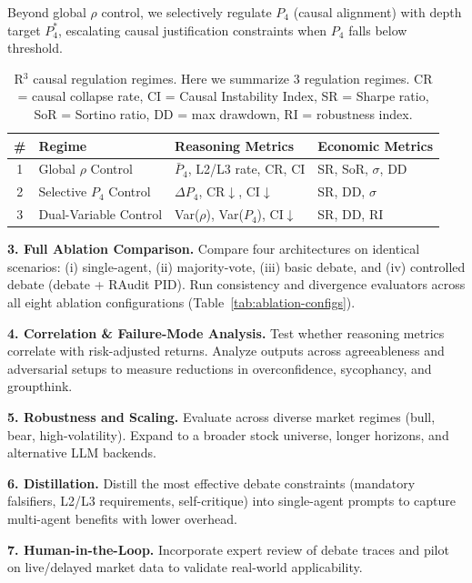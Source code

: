 \documentclass{article}
\begin{document}
Beyond global $\rho$ control, we selectively regulate $P_4$ (causal alignment) with depth target $P_4^*$, escalating causal justification constraints when $P_4$ falls below threshold. 

\begin{table}[H]
\centering
\small
\begin{tabular}{@{}clll@{}}
\toprule
\textbf{\#} & \textbf{Regime} & \textbf{Reasoning Metrics} & \textbf{Economic Metrics} \\
\midrule
1 & Global $\rho$ Control
& $\bar{P}_4$, L2/L3 rate, CR, CI
& SR, SoR, $\sigma$, DD \\
2 & Selective $P_4$ Control
& $\Delta P_4$, CR$\downarrow$, CI$\downarrow$
& SR, DD, $\sigma$ \\
3 & Dual-Variable Control
& Var($\rho$), Var($P_4$), CI$\downarrow$
& SR, DD, RI \\
\bottomrule
\end{tabular}
\vspace{4pt}
\setlength{\belowcaptionskip}{-4pt}
\caption{R$^3$ causal regulation regimes. Here we summarize 3 regulation regimes. CR = causal collapse rate, CI = Causal Instability Index, SR = Sharpe ratio, SoR = Sortino ratio, DD = max drawdown, RI = robustness index.}
\label{tab:r3-regimes}
\end{table}

\textbf{3. Full Ablation Comparison.}
Compare four architectures on identical scenarios: (i) single-agent, (ii) majority-vote, (iii) basic debate, and (iv) controlled debate (debate + RAudit PID). Run consistency and divergence evaluators across all eight ablation configurations (Table~\ref{tab:ablation-configs}).

\textbf{4. Correlation \& Failure-Mode Analysis.}
Test whether reasoning metrics correlate with risk-adjusted returns. Analyze outputs across agreeableness and adversarial setups to measure reductions in overconfidence, sycophancy, and groupthink.

\textbf{5. Robustness and Scaling.}
Evaluate across diverse market regimes (bull, bear, high-volatility). Expand to a broader stock universe, longer horizons, and alternative LLM backends.

\textbf{6. Distillation.}
Distill the most effective debate constraints (mandatory falsifiers, L2/L3 requirements, self-critique) into single-agent prompts to capture multi-agent benefits with lower overhead.

\textbf{7. Human-in-the-Loop.}
Incorporate expert review of debate traces and pilot on live/delayed market data to validate real-world applicability.
\end{document}
